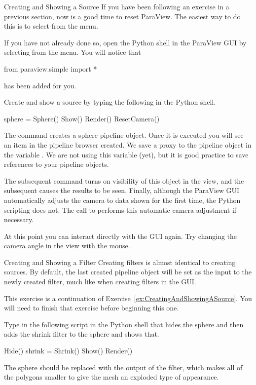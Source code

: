 \begin{exercise}{Creating and Showing a Source}
  \label{ex:CreatingAndShowingASource}%
  If you have been following an exercise in a previous section, now is a
  good time to reset ParaView.  The easiest way to do this is to select
   \ra {} from the menu.

  If you have not already done so, open the Python shell in the ParaView
  GUI by selecting  \ra {} from the menu.  You
  will notice that
  \begin{python}
from paraview.simple import *
  \end{python}
  has been added for you.

  Create and show a  source by typing the following in the
  Python shell.
  \begin{python}
sphere = Sphere()
Show()
Render()
ResetCamera()
  \end{python}

  The  command creates a sphere pipeline object.  Once it is
  executed you will see an item in the pipeline browser created.  We save a
  proxy to the pipeline object in the variable
  .  We are not using this variable (yet), but it is good
  practice to save references to your pipeline objects.

  The subsequent  command turns on visibility of this object
  in the view, and the subsequent  causes the results to be
  seen. Finally, although the ParaView GUI automatically adjusts the camera
  to data shown for the first time, the Python scripting does not. The call
  to  performs this automatic camera adjustment if
  necessary.

  At this point you can interact directly with the GUI again.  Try
  changing the camera angle in the view with the mouse.
\end{exercise}

\begin{exercise}{Creating and Showing a Filter}
  \label{ex:CreatingAndShowingAFilter}%
  Creating filters is almost identical to creating sources.  By default,
  the last created pipeline object will be set as the input to the newly
  created filter, much like when creating filters in the GUI.

  This exercise is a continuation of
  Exercise~\ref{ex:CreatingAndShowingASource}.  You will need to finish
  that exercise before beginning this one.

  Type in the following script in the Python shell that hides the sphere
  and then adds the shrink filter to the sphere and shows that.

  \begin{python}
Hide()
shrink = Shrink()
Show()
Render()
  \end{python}

  The sphere should be replaced with the output of the 
  filter, which makes all of the polygons smaller to give the mesh an
  exploded type of appearance.
\end{exercise}

